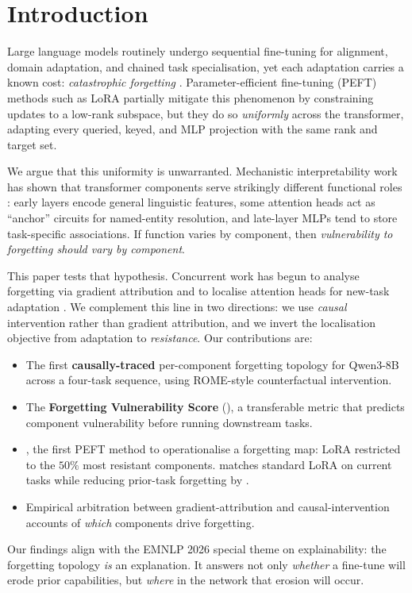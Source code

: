 \section{Introduction}
\label{sec:intro}


Large language models routinely undergo sequential fine-tuning for alignment, domain adaptation, and chained task specialisation, yet each adaptation carries a known cost: \textit{catastrophic forgetting} \citep[e.g.,][]{mccloskey1989catastrophic, french1999catastrophic, kirkpatrick2017ewc}. Parameter-efficient fine-tuning (PEFT) methods such as LoRA \citep{hu2022lora} partially mitigate this phenomenon by constraining updates to a low-rank subspace, but they do so \textit{uniformly} across the transformer, adapting every queried, keyed, and MLP projection with the same rank and target set.

We argue that this uniformity is unwarranted. Mechanistic interpretability work has shown that transformer components serve strikingly different functional roles \citep{elhage2021mathematical, meng2022locating, geva2023dissecting}: early layers encode general linguistic features, some attention heads act as ``anchor'' circuits for named-entity resolution, and late-layer MLPs tend to store task-specific associations. If function varies by component, then \textit{vulnerability to forgetting should vary by component}.

This paper tests that hypothesis. Concurrent work has begun to analyse forgetting via gradient attribution \citep{anon2026mechforget, lrdistribution2024} and to localise attention heads for new-task adaptation \citep{yin2024lofit}. We complement this line in two directions: we use \textit{causal} intervention rather than gradient attribution, and we invert the localisation objective from adaptation to \textit{resistance}. Our contributions are:

\begin{itemize}
  \item The first \textbf{causally-traced} per-component forgetting topology for Qwen3-8B across a four-task sequence, using ROME-style counterfactual intervention.
  \item The \textbf{Forgetting Vulnerability Score} (\fvs{}), a transferable metric that predicts component vulnerability before running downstream tasks.
  \item \textbf{\tglora{}}, the first PEFT method to operationalise a forgetting map: LoRA restricted to the $50\%$ most resistant components. \tglora{} matches standard LoRA on current tasks while reducing prior-task forgetting by .
  \item Empirical arbitration between gradient-attribution and causal-intervention accounts of \textit{which} components drive forgetting.
\end{itemize}

Our findings align with the EMNLP 2026 special theme on explainability: the forgetting topology \textit{is} an explanation. It answers not only \textit{whether} a fine-tune will erode prior capabilities, but \textit{where} in the network that erosion will occur.
